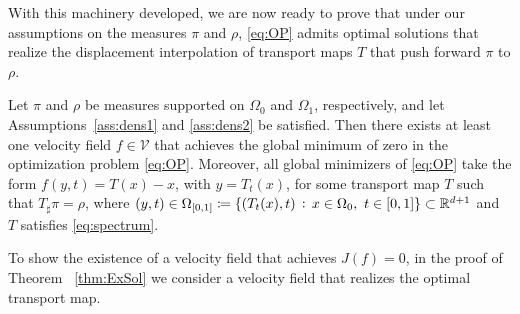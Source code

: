 With this machinery developed, we are now ready to prove that under our assumptions on the measures $\pi$ and $\rho$, \eqref{eq:OP} admits optimal solutions that realize the displacement interpolation of  transport maps $T$ that push forward $\pi$ to $\rho$. 


\begin{theorem}\label{thm:ExSol}
  Let $\pi$ and $\rho$ be measures supported on $\Omega_0$ and $\Omega_1$, respectively, and let Assumptions~\ref{ass:dens1} and \ref{ass:dens2} be satisfied. Then there exists at least one velocity field $f \in \mathcal{V}$
  that achieves the global minimum of zero in the optimization problem \eqref{eq:OP}. Moreover, all global minimizers of \eqref{eq:OP} take the form $f(y,t) = T(x) - x$, with $y = T_t(x)$, for some transport map $T$ such that $T_\sharp\pi = \rho$, where $(y,t)\in\Omega_{[0,1]} \coloneqq \{(T_t(x),t)\, :\,x\in\Omega_0,\ t\in[0,1] \} \subset
  \mathbb{R}^{d+1}$ and $T$ satisfies \eqref{eq:spectrum}.
\end{theorem}
To show the existence of a velocity field that achieves $J(f) = 0$, in the proof of Theorem ~\ref{thm:ExSol} we consider a velocity field that realizes the optimal transport map. 
